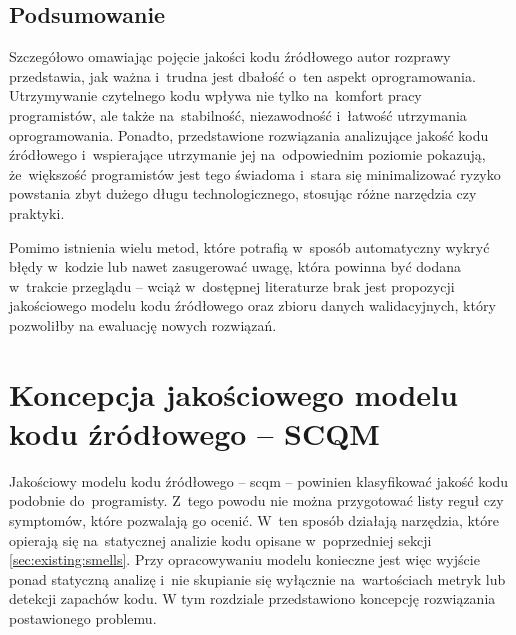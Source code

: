 \documentclass[twoside]{praca}
\begin{document}
\section{Podsumowanie}

Szczegółowo omawiając pojęcie jakości kodu źródłowego autor rozprawy przedstawia, jak ważna i~trudna jest dbałość o~ten aspekt oprogramowania. Utrzymywanie czytelnego kodu wpływa nie tylko na~komfort pracy programistów, ale także na~stabilność, niezawodność i~łatwość utrzymania oprogramowania. Ponadto, przedstawione rozwiązania analizujące jakość kodu źródłowego i~wspierające utrzymanie jej na~odpowiednim poziomie pokazują, że~większość programistów jest tego świadoma i~stara się minimalizować ryzyko powstania zbyt dużego długu technologicznego, stosując różne narzędzia czy praktyki.

Pomimo istnienia wielu metod, które potrafią w~sposób automatyczny wykryć błędy w~kodzie lub nawet zasugerować uwagę, która powinna być dodana w~trakcie przeglądu -- wciąż w~dostępnej literaturze brak jest propozycji jakościowego modelu kodu źródłowego oraz zbioru danych walidacyjnych, który pozwoliłby na ewaluację nowych rozwiązań.

\cleardoublepage
\chapter{Koncepcja jakościowego modelu kodu źródłowego -- SCQM}
\label{ch:proj}

\begin{addmargin}{1cm}
Jakościowy modelu kodu źródłowego -- \gls{scqm} -- powinien klasyfikować jakość kodu podobnie do~programisty. Z~tego powodu nie można przygotować listy reguł czy symptomów, które pozwalają go ocenić. W~ten sposób działają narzędzia, które opierają się na~statycznej analizie kodu opisane w~poprzedniej sekcji \ref{sec:existing:smells}. Przy opracowywaniu modelu konieczne jest więc wyjście ponad statyczną analizę i~nie skupianie się wyłącznie na~wartościach metryk lub detekcji zapachów kodu. 
W tym rozdziale przedstawiono koncepcję rozwiązania postawionego problemu.
\end{addmargin}
\end{document}
